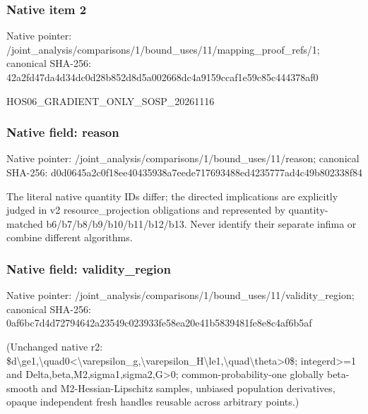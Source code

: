 \documentclass[10pt,a4paper]{article}
\begin{document}
\subsubsection{Native item 2}
Native pointer: /joint\_\allowbreak{}analysis/comparisons/1/bound\_\allowbreak{}uses/11/mapping\_\allowbreak{}proof\_\allowbreak{}refs/1; canonical SHA-256: 42a2fd47da4d34dc0d28b852d8d5a002668dc4a9159ccaf1e59c85c444378af0

\begingroup\raggedright\sloppy HOS06\_\allowbreak{}GRADIENT\_\allowbreak{}ONLY\_\allowbreak{}SOSP\_\allowbreak{}20261116\par\endgroup

\subsubsection{Native field: reason}
Native pointer: /joint\_\allowbreak{}analysis/comparisons/1/bound\_\allowbreak{}uses/11/reason; canonical SHA-256: d0d0645a2c0f18ee40435938a7eede717693488ed4235777ad4c49b802338f84

\begingroup\raggedright\sloppy The literal native quantity IDs differ;\allowbreak{} the directed implications are explicitly judged in v2 resource\_\allowbreak{}projection obligations and represented by quantity-matched b6/\allowbreak{}b7/\allowbreak{}b8/\allowbreak{}b9/\allowbreak{}b10/\allowbreak{}b11/\allowbreak{}b12/\allowbreak{}b13. Never identify their separate infima or combine different algorithms.\par\endgroup

\subsubsection{Native field: validity\_\allowbreak{}region}
Native pointer: /joint\_\allowbreak{}analysis/comparisons/1/bound\_\allowbreak{}uses/11/validity\_\allowbreak{}region; canonical SHA-256: 0af6bc7d4d72794642a23549c023933fe58ea20e41b5839481fe8e8c4af6b5af

\begingroup\raggedright\sloppy (Unchanged native r2:\allowbreak{} \$d\textbackslash{}ge1,\allowbreak{}\textbackslash{}quad0<\textbackslash{}varepsilon\_\allowbreak{}g,\allowbreak{}\textbackslash{}varepsilon\_\allowbreak{}H\textbackslash{}le1,\allowbreak{}\textbackslash{}quad\textbackslash{}theta>0\$;\allowbreak{} integerd>=\allowbreak{}1 and Delta,\allowbreak{}beta,\allowbreak{}M2,\allowbreak{}sigma1,\allowbreak{}sigma2,\allowbreak{}G>0;\allowbreak{} common-probability-one globally beta-smooth and M2-Hessian-Lipschitz samples,\allowbreak{} unbiased population derivatives,\allowbreak{} opaque independent fresh handles reusable across arbitrary points.)\par\endgroup
\end{document}
